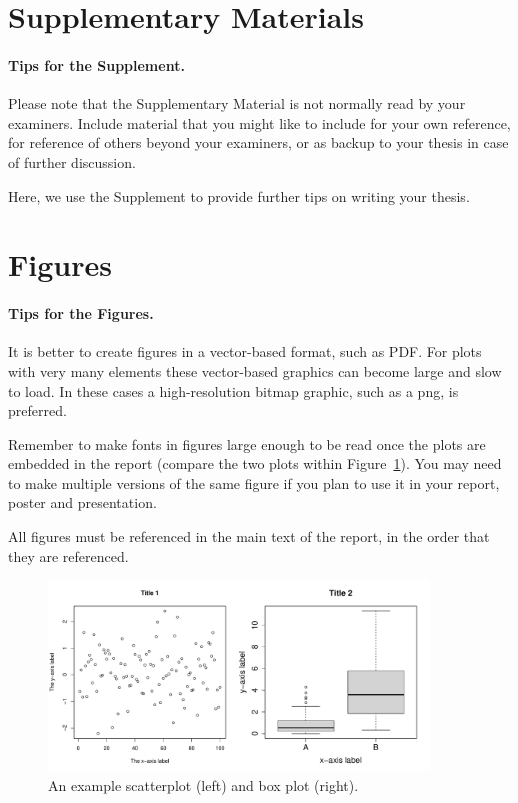 \pagebreak

\section{Supplementary Materials}

\paragraph{Tips for the Supplement.} Please note that the Supplementary Material is not normally read by your examiners. Include material that you might like to include for your own reference, for reference of others beyond your examiners, or as backup to your thesis in case of further discussion.

Here, we use the Supplement to provide further tips on writing your thesis.

\section{Figures}\label{sec:figuresection}

\paragraph{Tips for the Figures.} It is better to create figures in a vector-based format, such as PDF. For plots with very many elements these vector-based graphics can become large and slow to load. In these cases a high-resolution bitmap graphic, such as a png, is preferred. 

Remember to make fonts in figures large enough to be read once the plots are embedded in the report (compare the two plots within Figure~\ref{fig:axis-label-example}). You may need to make multiple versions of the same figure if you plan to use it in your report, poster and presentation.

All figures must be referenced in the main text of the report, in the order that they are referenced.

\begin{figure}[htbp]
    \centering
    \includegraphics[width=0.9\textwidth]{images/fig1.pdf}
    \caption{An example scatterplot (left) and box plot (right).}
    \label{fig:axis-label-example}
\end{figure}

